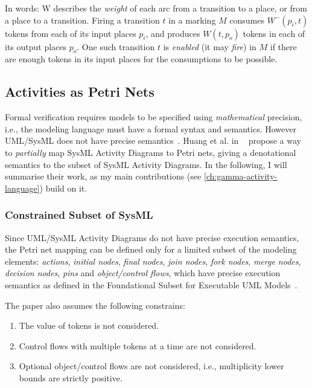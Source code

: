 In words: W describes the \emph{weight} of each arc from a transition to a place, or from a place to a transition. Firing a transition \(t\) in a marking \(M\) consumes \(W^-(p_i, t)\) tokens from each of its input places \(p_i\), and produces \(W(t, p_o)\) tokens in each of its output places \(p_o\). One such transition \(t\) is \emph{enabled} (it may \emph{fire}) in \(M\) if there are enough tokens in its input places for the consumptions to be possible.

\subsection{Activities as Petri Nets}\label{ssec:activities-as-petri-nets}

Formal verification requires models to be specified using \emph{mathematical} precision, i.e., the modeling language must have a formal syntax and semantics. However UML/SysML does not have precise semantics~\cite{pssm-testing, pssm, euml}. Huang et al. in ~\cite{https://doi.org/10.1002/sys.21524} propose a way to \emph{partially} map SysML Activity Diagrams to Petri nets, giving a denotational semantics to the subset of SysML Activity Diagrams. In the following, I will summarise their work, as my main contributions (see \autoref{ch:gamma-activity-language}) build on it.

\subsubsection*{Constrained Subset of SysML}\label{ssec:sysml_assumptions}

Since UML/SysML Activity Diagrams do not have precise execution semantics, the Petri net mapping can be defined only for a limited subset of the modeling elements: \emph{actions}, \emph{initial nodes}, \emph{final nodes}, \emph{join nodes}, \emph{fork nodes}, \emph{merge nodes}, \emph{decision nodes}, \emph{pins} and \emph{object/control flows}, which have precise execution semantics as defined in the Foundational Subset for Executable UML Models~\cite{fuml}.

The paper also assumes the following constrains:

\begin{enumerate}
	\item The value of tokens is not considered.
	\item Control flows with multiple tokens at a time are not considered.
	\item Optional object/control flows are not considered, i.e., multiplicity lower bounds are strictly positive.
\end{enumerate}

